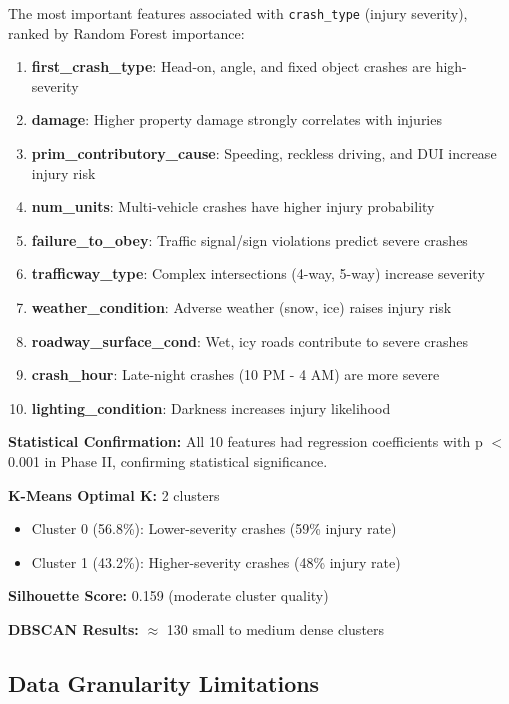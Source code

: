 \documentclass[stu,12pt,floatsintext]{apa7}
\begin{document}
The most important features associated with \texttt{crash\_type} (injury severity), ranked by Random Forest importance:

\begin{enumerate}
    \item \textbf{first\_crash\_type}: Head-on, angle, and fixed object crashes are high-severity
    \item \textbf{damage}: Higher property damage strongly correlates with injuries
    \item \textbf{prim\_contributory\_cause}: Speeding, reckless driving, and DUI increase injury risk
    \item \textbf{num\_units}: Multi-vehicle crashes have higher injury probability
    \item \textbf{failure\_to\_obey}: Traffic signal/sign violations predict severe crashes
    \item \textbf{trafficway\_type}: Complex intersections (4-way, 5-way) increase severity
    \item \textbf{weather\_condition}: Adverse weather (snow, ice) raises injury risk
    \item \textbf{roadway\_surface\_cond}: Wet, icy roads contribute to severe crashes
    \item \textbf{crash\_hour}: Late-night crashes (10 PM - 4 AM) are more severe
    \item \textbf{lighting\_condition}: Darkness increases injury likelihood
\end{enumerate}

\textbf{Statistical Confirmation:} All 10 features had regression coefficients with p $<$ 0.001 in Phase II, confirming statistical significance.

\textbf{K-Means Optimal K:} 2 clusters
\begin{itemize}
    \item Cluster 0 (56.8\%): Lower-severity crashes (59\% injury rate)
    \item Cluster 1 (43.2\%): Higher-severity crashes (48\% injury rate)
\end{itemize}

\textbf{Silhouette Score:} 0.159 (moderate cluster quality)

\textbf{DBSCAN Results:} $\approx$ 130 small to medium dense clusters

\subsection{Data Granularity Limitations}
\end{document}
